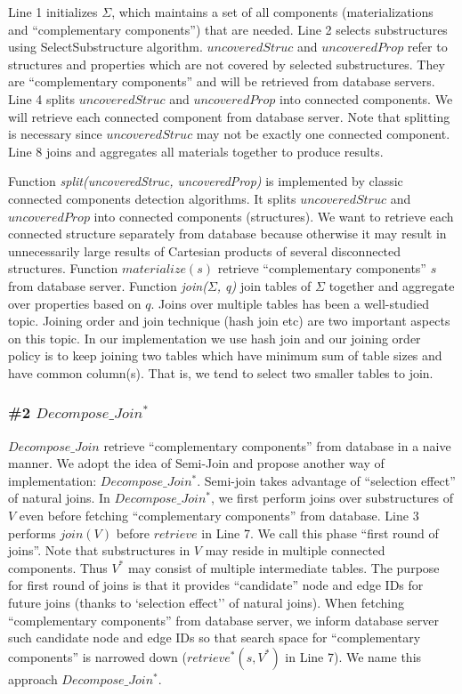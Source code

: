 Line 1 initializes $\Sigma$, which maintains a set of all components (materializations and ``complementary  components'') that are needed. Line 2 selects substructures using SelectSubstructure algorithm. $uncoveredStruc$ and $uncoveredProp$ refer to structures and properties which are not covered by selected substructures. They are ``complementary components'' and will be retrieved from database servers. Line 4 splits $uncoveredStruc$ and $uncoveredProp$ into connected components. We will retrieve each connected component from database server. Note that splitting is necessary since $uncoveredStruc$ may not be exactly one connected component. Line 8 joins and aggregates all materials together to produce results. 

Function \textit{split(uncoveredStruc, uncoveredProp)} is implemented by classic connected components detection algorithms. It splits $uncoveredStruc$ and $uncoveredProp$ into connected components (structures). We want to retrieve each connected structure separately from database because otherwise it may result in unnecessarily large results of Cartesian products of several disconnected structures. Function \textit{$materialize(s)$} retrieve ``complementary components'' $s$ from database server. Function \textit{join($\Sigma$, q)} join tables of $\Sigma$ together and aggregate over properties based on $q$. Joins over multiple tables has been a well-studied topic. Joining order and join technique (hash join etc) are two important aspects on this topic. In our implementation we use hash join and our joining order policy is to keep joining two tables which have minimum sum of table sizes and have common column(s). That is, we tend to select two smaller tables to join.  

\subsubsection{\#2 $Decompose\_Join^{*}$}
$Decompose\_Join$ retrieve ``complementary components'' from database in a naive manner. We adopt the idea of Semi-Join \cite{DBLP:journals/dr/Ozsoyoglu99} and propose another way of implementation: $Decompose\_Join^{*}$. Semi-join takes advantage of ``selection effect'' of natural joins. In $Decompose\_Join^{*}$, we first perform joins over substructures of $V$ even before fetching ``complementary components'' from database. Line 3 performs $join(V)$ before $retrieve$ in Line 7. We call this phase ``first round of joins''.  Note that substructures in $V$ may reside in multiple connected components. Thus $V^{*}$ may consist of multiple intermediate tables. The purpose for first round of joins is that it provides ``candidate'' node and edge IDs for future joins (thanks to `selection effect'' of natural joins). When fetching ``complementary components'' from database server, we inform database server such candidate node and edge IDs so that search space for ``complementary components'' is narrowed down ($retrieve^{*}(s, V^{*})$ in Line 7). We name this approach $Decompose\_Join^{*}$. 

